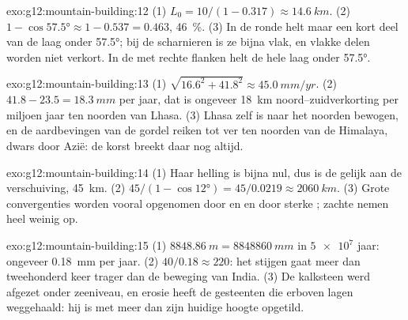 \begin{solution}{exo:g12:mountain-building:12}
(1) $L_0 = 10/(1 - 0.317) \approx \qty{14.6}{km}$. (2) $1 - \cos\ang{57.5}
\approx 1 - 0.537 = 0.463$, \qty{46}{\percent}. (3) In de ronde 
helt maar een kort deel van de laag onder \ang{57.5}; bij de scharnieren is ze
bijna vlak, en vlakke delen worden niet verkort. In de  met rechte flanken
helt de hele laag onder \ang{57.5}.
\end{solution}

\begin{solution}{exo:g12:mountain-building:13}
(1) $\sqrt{16.6^2 + 41.8^2} \approx \qty{45.0}{mm/yr}$. (2) $41.8 - 23.5 =
\qty{18.3}{mm}$ per jaar, dat is ongeveer \qty{18}{km} noord--zuidverkorting
per miljoen jaar ten noorden van Lhasa. (3) Lhasa zelf is naar het noorden bewogen, en de
aardbevingen van de gordel reiken tot ver ten noorden van de Himalaya, dwars door Azië: de
korst breekt daar nog altijd.
\end{solution}

\begin{solution}{exo:g12:mountain-building:14}
(1) Haar helling is bijna nul, dus is de  gelijk aan de verschuiving,
\qty{45}{km}. (2) $45/(1 - \cos\ang{12}) = 45/0.0219 \approx \qty{2060}{km}$.
(3) Grote convergenties worden vooral opgenomen door  en  en door sterke
; zachte  nemen heel weinig op.
\end{solution}

\begin{solution}{exo:g12:mountain-building:15}
(1) $\qty{8848.86}{m} = \qty{8848860}{mm}$ in $\num{5e7}$ jaar: ongeveer
\qty{0.18}{mm} per jaar. (2) $40/0.18 \approx 220$: het stijgen gaat meer dan
tweehonderd keer trager dan de beweging van India. (3) De kalksteen werd afgezet
onder zeeniveau, en erosie heeft de gesteenten die erboven lagen weggehaald: hij is
met meer dan zijn huidige hoogte opgetild.
\end{solution}

